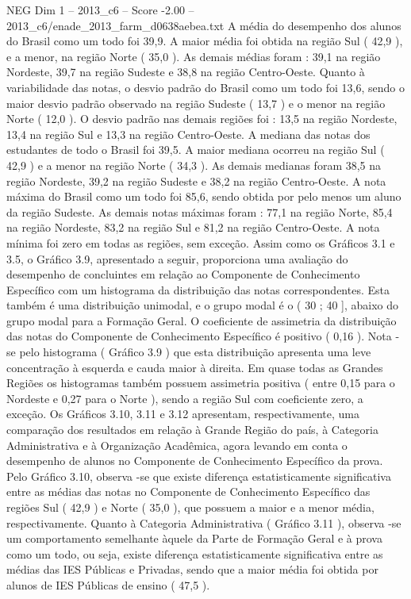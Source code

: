 \begin{textsample}{NEG Dim 1 – 2013\_c6 – Score -2.00 – 2013\_c6/enade\_2013\_farm\_d0638aebea.txt}
A média do desempenho dos alunos do Brasil como um todo foi 39,9.
A maior média foi obtida na região Sul ( 42,9 ), e a menor, na região Norte ( 35,0 ).
As demais médias foram : 39,1 na região Nordeste, 39,7 na região Sudeste e 38,8 na região Centro-Oeste.
Quanto à variabilidade das notas, o desvio padrão do Brasil como um todo foi 13,6, sendo o maior desvio padrão observado na região Sudeste ( 13,7 ) e o menor na região Norte ( 12,0 ).
O desvio padrão nas demais regiões foi : 13,5 na região Nordeste, 13,4 na região Sul e 13,3 na região Centro-Oeste.
A mediana das notas dos estudantes de todo o Brasil foi 39,5.
A maior mediana ocorreu na região Sul ( 42,9 ) e a menor na região Norte ( 34,3 ).
As demais medianas foram 38,5 na região Nordeste, 39,2 na região Sudeste e 38,2 na região Centro-Oeste.
A nota máxima do Brasil como um todo foi 85,6, sendo obtida por pelo menos um aluno da região Sudeste.
As demais notas máximas foram : 77,1 na região Norte, 85,4 na região Nordeste, 83,2 na região Sul e 81,2 na região Centro-Oeste.
A nota mínima foi zero em todas as regiões, sem exceção.
Assim como os Gráficos 3.1 e 3.5, o Gráfico 3.9, apresentado a seguir, proporciona uma avaliação do desempenho de concluintes em relação ao Componente de Conhecimento Específico com um histograma da distribuição das notas correspondentes.
Esta também é uma distribuição unimodal, e o grupo modal é o ( 30 ; 40 ], abaixo do grupo modal para a Formação Geral.
O coeficiente de assimetria da distribuição das notas do Componente de Conhecimento Específico é positivo ( 0,16 ).
Nota -se pelo histograma ( Gráfico 3.9 ) que esta distribuição apresenta uma leve concentração à esquerda e cauda maior à direita.
Em quase todas as Grandes Regiões os histogramas também possuem assimetria positiva ( entre 0,15 para o Nordeste e 0,27 para o Norte ), sendo a região Sul com coeficiente zero, a exceção.
Os Gráficos 3.10, 3.11 e 3.12 apresentam, respectivamente, uma comparação dos resultados em relação à Grande Região do país, à Categoria Administrativa e à Organização Acadêmica, agora levando em conta o desempenho de alunos no Componente de Conhecimento Específico da prova.
Pelo Gráfico 3.10, observa -se que existe diferença estatisticamente significativa entre as médias das notas no Componente de Conhecimento Específico das regiões Sul ( 42,9 ) e Norte ( 35,0 ), que possuem a maior e a menor média, respectivamente.
Quanto à Categoria Administrativa ( Gráfico 3.11 ), observa -se um comportamento semelhante àquele da Parte de Formação Geral e à prova como um todo, ou seja, existe diferença estatisticamente significativa entre as médias das IES Públicas e Privadas, sendo que a maior média foi obtida por alunos de IES Públicas de ensino ( 47,5 ).

\end{textsample}
